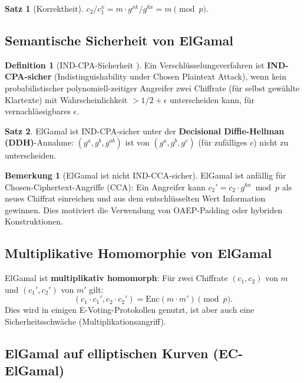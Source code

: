 ﻿\documentclass[a4paper,12pt]{scrreprt}
\theoremstyle{definition}
\newtheorem{definition}{Definition}[section]
\newtheorem{bemerkung}{Bemerkung}[section]
\newtheorem{satz}{Satz}[section]
\begin{document}
\begin{satz}[Korrektheit]
$c_2 / c_1^x = m \cdot g^{xk} / g^{kx} = m \pmod{p}$.
\end{satz}

\subsection{Semantische Sicherheit von ElGamal}

\begin{definition}[IND-CPA-Sicherheit \cite{GM84}]
Ein Verschlüsselungsverfahren ist \textbf{IND-CPA-sicher} (Indistinguishability under Chosen Plaintext Attack), wenn kein probabilistischer polynomiell-zeitiger Angreifer zwei Chiffrate (für selbst gewählte Klartexte) mit Wahrscheinlichkeit $> 1/2 + \epsilon$ unterscheiden kann, für vernachlässigbares $\epsilon$.
\end{definition}

\begin{satz}
ElGamal ist IND-CPA-sicher unter der \textbf{Decisional Diffie-Hellman (DDH)}-Annahme: $(g^a, g^b, g^{ab})$ ist von $(g^a, g^b, g^c)$ (für zufälliges $c$) nicht zu unterscheiden.
\end{satz}

\begin{bemerkung}[ElGamal ist nicht IND-CCA-sicher]
ElGamal ist anfällig für Chosen-Ciphertext-Angriffe (CCA): Ein Angreifer kann $c_2' = c_2 \cdot g^{kx} \bmod p$ als neues Chiffrat einreichen und aus dem entschlüsselten Wert Information gewinnen. Dies motiviert die Verwendung von OAEP-Padding oder hybriden Konstruktionen.
\end{bemerkung}

\subsection{Multiplikative Homomorphie von ElGamal}

ElGamal ist \textbf{multiplikativ homomorph}: Für zwei Chiffrate $(c_1, c_2)$ von $m$ und $(c_1', c_2')$ von $m'$ gilt:
\[
(c_1 \cdot c_1', c_2 \cdot c_2') = \mathrm{Enc}(m \cdot m') \pmod{p}.
\]
Dies wird in einigen E-Voting-Protokollen genutzt, ist aber auch eine Sicherheitsschwäche (Multiplikationsangriff).

\subsection{ElGamal auf elliptischen Kurven (EC-ElGamal)}
\end{document}

